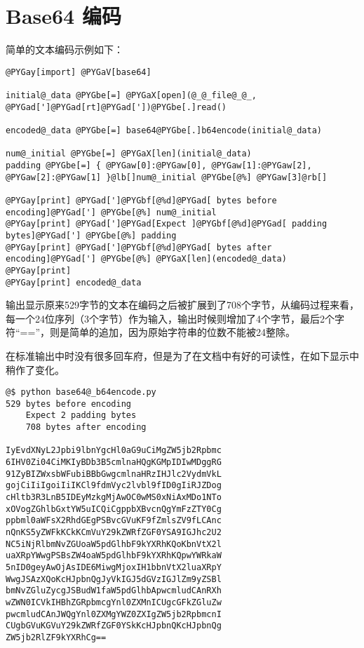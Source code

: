 \documentclass[a4paper,10pt,english]{manual}
\begin{document}
\section{Base64 编码}

简单的文本编码示例如下：

\begin{Verbatim}[commandchars=@\[\]]
@PYGay[import] @PYGaV[base64]

initial@_data @PYGbe[=] @PYGaX[open](@_@_file@_@_, @PYGad[']@PYGad[rt]@PYGad['])@PYGbe[.]read()

encoded@_data @PYGbe[=] base64@PYGbe[.]b64encode(initial@_data)

num@_initial @PYGbe[=] @PYGaX[len](initial@_data)
padding @PYGbe[=] { @PYGaw[0]:@PYGaw[0], @PYGaw[1]:@PYGaw[2], @PYGaw[2]:@PYGaw[1] }@lb[]num@_initial @PYGbe[@%] @PYGaw[3]@rb[]

@PYGay[print] @PYGad[']@PYGbf[@%d]@PYGad[ bytes before encoding]@PYGad['] @PYGbe[@%] num@_initial
@PYGay[print] @PYGad[']@PYGad[Expect ]@PYGbf[@%d]@PYGad[ padding bytes]@PYGad['] @PYGbe[@%] padding
@PYGay[print] @PYGad[']@PYGbf[@%d]@PYGad[ bytes after encoding]@PYGad['] @PYGbe[@%] @PYGaX[len](encoded@_data)
@PYGay[print]
@PYGay[print] encoded@_data
\end{Verbatim}

输出显示原来529字节的文本在编码之后被扩展到了708个字节，从编码过程来看，每一个24位序列（3个字节）作为输入，输出时候则增加了4个字节，最后2个字符“==”，则是简单的追加，因为原始字符串的位数不能被24整除。

在标准输出中时没有很多回车府，但是为了在文档中有好的可读性，在如下显示中稍作了变化。

\begin{Verbatim}[commandchars=@\[\]]
@$ python base64@_b64encode.py
529 bytes before encoding
    Expect 2 padding bytes
    708 bytes after encoding

IyEvdXNyL2Jpbi9lbnYgcHl0aG9uCiMgZW5jb2Rpbmc
6IHV0Zi04CiMKIyBDb3B5cmlnaHQgKGMpIDIwMDggRG
91ZyBIZWxsbWFubiBBbGwgcmlnaHRzIHJlc2VydmVkL
gojCiIiIgoiIiIKCl9fdmVyc2lvbl9fID0gIiRJZDog
cHltb3R3LnB5IDEyMzkgMjAwOC0wMS0xNiAxMDo1NTo
xOVogZGhlbGxtYW5uICQiCgppbXBvcnQgYmFzZTY0Cg
ppbml0aWFsX2RhdGEgPSBvcGVuKF9fZmlsZV9fLCAnc
nQnKS5yZWFkKCkKCmVuY29kZWRfZGF0YSA9IGJhc2U2
NC5iNjRlbmNvZGUoaW5pdGlhbF9kYXRhKQoKbnVtX2l
uaXRpYWwgPSBsZW4oaW5pdGlhbF9kYXRhKQpwYWRkaW
5nID0geyAwOjAsIDE6MiwgMjoxIH1bbnVtX2luaXRpY
WwgJSAzXQoKcHJpbnQgJyVkIGJ5dGVzIGJlZm9yZSBl
bmNvZGluZycgJSBudW1faW5pdGlhbApwcmludCAnRXh
wZWN0ICVkIHBhZGRpbmcgYnl0ZXMnICUgcGFkZGluZw
pwcmludCAnJWQgYnl0ZXMgYWZ0ZXIgZW5jb2RpbmcnI
CUgbGVuKGVuY29kZWRfZGF0YSkKcHJpbnQKcHJpbnQg
ZW5jb2RlZF9kYXRhCg==
\end{Verbatim}
\end{document}
